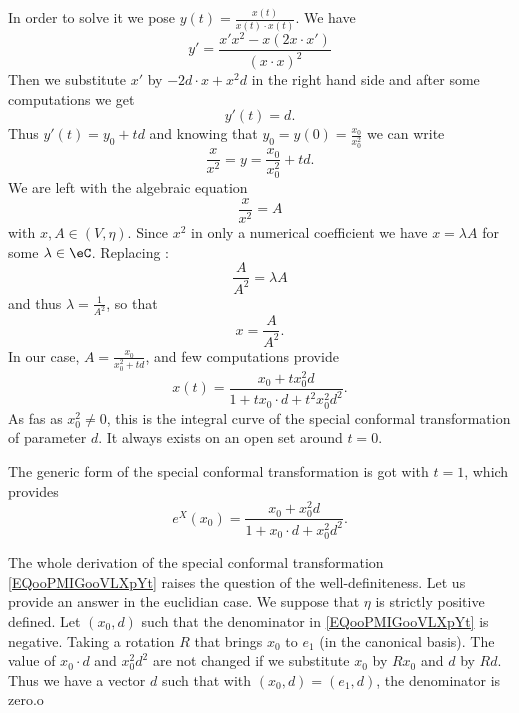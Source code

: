 \begin{description}
    In order to solve it we pose \( y(t)=\frac{ x(t) }{ x(t)\cdot x(t) }\). We have
    \begin{equation}
        y'=\frac{ x'x^2-x(2x\cdot x') }{ (x\cdot x)^2 }
    \end{equation}
    Then we substitute \( x'\) by \( -2d\cdot x+x^2d\) in the right hand side and after some computations we get
    \begin{equation}
        y'(t)=d.
    \end{equation}
    Thus \( y'(t)=y_{0}+td\) and knowing that \( y_0=y(0)=\frac{ x_0 }{ x_0^2 }\) we can write
    \begin{equation}
        \frac{ x }{ x^2 }=y=\frac{ x_0 }{ x_0^2 }+td.
    \end{equation}
    We are left with the algebraic equation
    \begin{equation}
        \frac{ x }{ x^2 }=A
    \end{equation}
    with \( x,A\in(V,\eta)\). Since \( x^2\) in only a numerical coefficient we have \( x=\lambda A\) for some \( \lambda\in \eC\). Replacing :
    \begin{equation}
        \frac{ A }{ A^2 }=\lambda A
    \end{equation}
    and thus \( \lambda=\frac{1}{ A^2 }\), so that
    \begin{equation}
        x=\frac{ A }{ A^2 }.
    \end{equation}
    In our case, \( A=\frac{ x_0 }{ x_0^2+td }\), and few computations provide
    \begin{equation}
        x(t)=\frac{ x_0+tx_0^2d }{ 1+tx_0\cdot d+t^2x_0^2d^2 }.
    \end{equation}
    As fas as \( x_0^2\neq 0\), this is the integral curve of the special conformal transformation of parameter \( d\). It always exists on an open set around \( t=0\).

    The generic form of the special conformal transformation is got with \( t=1\), which provides
    \begin{equation}        \label{EQooPMIGooVLXpYt}
        e^{X}(x_0)=\frac{ x_0+x_0^2d }{ 1+x_0\cdot d+x_0^2d^2 }.
    \end{equation}
\end{description}

The whole derivation of the special conformal transformation \eqref{EQooPMIGooVLXpYt} raises the question of the well-definiteness. Let us provide an answer in the euclidian case. We suppose that \( \eta\) is strictly positive defined. Let \( (x_0,d)\) such that the denominator in \eqref{EQooPMIGooVLXpYt} is negative. Taking a rotation \( R\) that brings \( x_0\) to \( e_1\) (in the canonical basis). The value of \( x_0\cdot d\) and \( x_0^2d^2 \) are not changed if we substitute \( x_0\) by \( Rx_0\) and \( d\) by \( Rd\). Thus we have a vector \( d\) such that with \( (x_0,d)=(e_1,d)\), the denominator is zero.o


